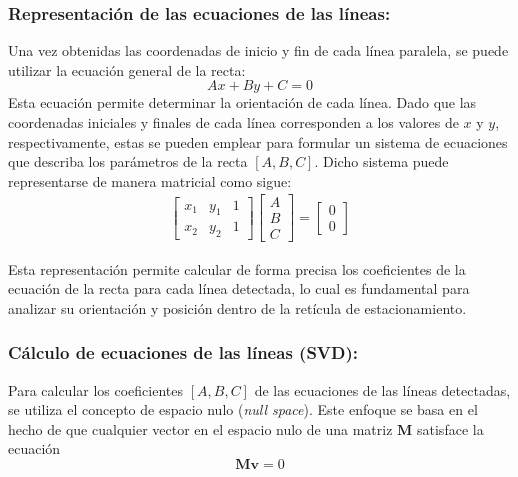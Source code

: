 \subsubsection{Representación de las ecuaciones de las líneas:}
\noindent
Una vez obtenidas las coordenadas de inicio y fin de cada línea paralela, se puede utilizar la ecuación general de la recta:
\begin{equation}
    Ax + By + C = 0
\end{equation}
Esta ecuación permite determinar la orientación de cada línea.
Dado que las coordenadas iniciales y finales de cada línea corresponden a los valores de $x$ y $y$, respectivamente,
estas se pueden emplear para formular un sistema de ecuaciones que describa los parámetros de la recta $[A, B, C]$.
Dicho sistema puede representarse de manera matricial como sigue:
\begin{equation}
    \begin{aligned}
        \left[\begin{array}{ccc}
                      x_1 & y_1 & 1 \\
                      x_2 & y_2 & 1
                  \end{array}\right]
        \begin{bmatrix}
            A \\
            B \\
            C
        \end{bmatrix}
        =
        \begin{bmatrix}
            0 \\
            0
        \end{bmatrix}
    \end{aligned}
\end{equation}

Esta representación permite calcular de forma precisa los coeficientes de la ecuación de la recta para cada línea detectada,
lo cual es fundamental para analizar su orientación y posición dentro de la retícula de estacionamiento.

\subsubsection{Cálculo de ecuaciones de las líneas (SVD):}
\noindent
Para calcular los coeficientes $[A, B, C]$ de las ecuaciones de las líneas detectadas, se utiliza el concepto de espacio nulo (\emph{null space}).
Este enfoque se basa en el hecho de que cualquier vector en el espacio nulo de una matriz $\mathbf{M}$ satisface la ecuación
\begin{equation}
    \mathbf{Mv} = 0
\end{equation}

